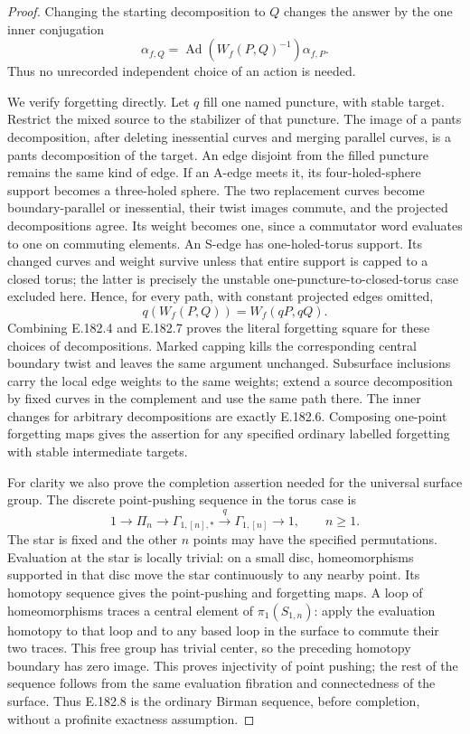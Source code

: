 \begin{proof}
Changing the starting decomposition to \(Q\) changes the
answer by the one inner conjugation
\[
 \alpha_{f,Q}
  =\operatorname{Ad}(W_f(P,Q)^{-1})\alpha_{f,P}.
\tag{E.182.6}
\]
Thus no unrecorded independent choice of an action is needed.

We verify forgetting directly.  Let \(q\) fill one named
puncture, with stable target.  Restrict the mixed source
to the stabilizer of that puncture.  The image of a pants
decomposition, after deleting inessential curves and merging
parallel curves, is a pants decomposition of the target.
An edge disjoint from the filled puncture remains the same
kind of edge.  If an A-edge meets it, its four-holed-sphere
support becomes a three-holed sphere.  The two replacement
curves become boundary-parallel or inessential, their twist
images commute, and the projected decompositions agree.
Its weight becomes one, since a commutator word evaluates
to one on commuting elements.
An S-edge has one-holed-torus support.  Its changed curves
and weight survive unless that entire support is capped to
a closed torus; the latter is precisely the unstable
one-puncture-to-closed-torus case excluded here.
Hence, for every path, with constant projected edges omitted,
\[
                    q(W_f(P,Q))=W_f(qP,qQ).
\tag{E.182.7}
\]
Combining E.182.4 and E.182.7 proves the literal forgetting
square for these choices of decompositions.
Marked capping kills the corresponding central boundary
twist and leaves the same argument unchanged.
Subsurface inclusions carry the local edge weights to the
same weights; extend a source decomposition by fixed curves
in the complement and use the same path there.
The inner changes for arbitrary decompositions are exactly
E.182.6.  Composing one-point forgetting maps gives the
assertion for any specified ordinary labelled forgetting
with stable intermediate targets.

For clarity we also prove the completion assertion needed
for the universal surface group.  The discrete point-pushing
sequence in the torus case is
\[
 1\longrightarrow\Pi_n\longrightarrow\Gamma_{1,[n],*}
       \xrightarrow{q}\Gamma_{1,[n]}\longrightarrow1,
                    \qquad n\geq1.
\tag{E.182.8}
\]
The star is fixed and the other \(n\) points may have the
specified permutations.  Evaluation at the star is locally
trivial: on a small disc, homeomorphisms supported in that
disc move the star continuously to any nearby point.
Its homotopy sequence gives the point-pushing and forgetting
maps.  A loop of homeomorphisms traces a central element of
\(\pi_1(S_{1,n})\): apply the evaluation homotopy to that
loop and to any based loop in the surface to commute their
two traces.  This free group has trivial center, so the
preceding homotopy boundary has zero image.
This proves injectivity of point pushing; the rest of the
sequence follows from the same evaluation fibration and
connectedness of the surface.  Thus E.182.8 is the ordinary
Birman sequence, before completion, without a profinite
exactness assumption.


\end{proof}
